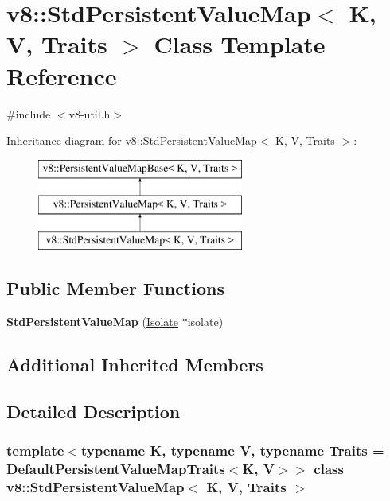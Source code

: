 \hypertarget{classv8_1_1StdPersistentValueMap}{}\section{v8\+:\+:Std\+Persistent\+Value\+Map$<$ K, V, Traits $>$ Class Template Reference}
\label{classv8_1_1StdPersistentValueMap}


{\ttfamily \#include $<$v8-\/util.\+h$>$}

Inheritance diagram for v8\+:\+:Std\+Persistent\+Value\+Map$<$ K, V, Traits $>$\+:\begin{figure}[H]
\begin{center}
\leavevmode
\includegraphics[height=3.000000cm]{classv8_1_1StdPersistentValueMap}
\end{center}
\end{figure}
\subsection*{Public Member Functions}
\begin{DoxyCompactItemize}
\item 
\mbox{\label{classv8_1_1StdPersistentValueMap_a44d7222a863267780db07c882056f73b}} 
{\bfseries Std\+Persistent\+Value\+Map} (\mbox{\hyperlink{classv8_1_1Isolate}{Isolate}} $\ast$isolate)
\end{DoxyCompactItemize}
\subsection*{Additional Inherited Members}


\subsection{Detailed Description}
\subsubsection*{template$<$typename K, typename V, typename Traits = Default\+Persistent\+Value\+Map\+Traits$<$\+K, V$>$$>$\newline
class v8\+::\+Std\+Persistent\+Value\+Map$<$ K, V, Traits $>$}

